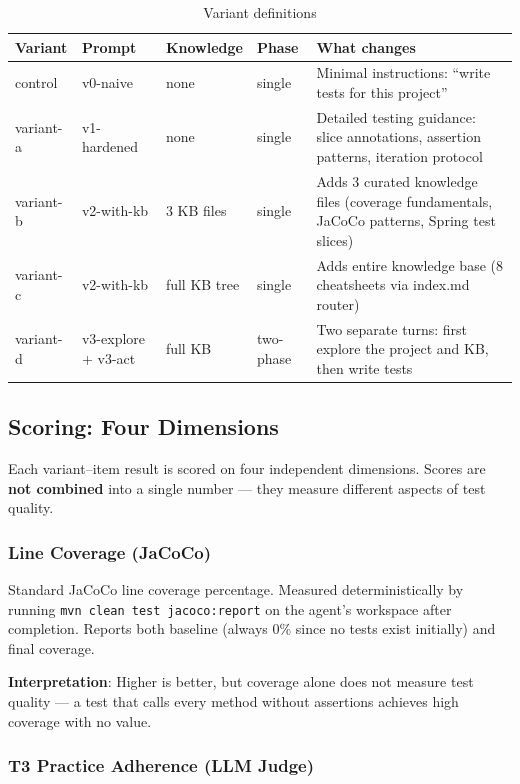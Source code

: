 \documentclass[11pt,a4paper]{article}
\begin{document}
\begin{table}[H]
\centering
\caption{Variant definitions}
\label{tab:variants}
\small
\begin{tabular}{@{}llllp{5cm}@{}}
\toprule
\textbf{Variant} & \textbf{Prompt} & \textbf{Knowledge} & \textbf{Phase} & \textbf{What changes} \\
\midrule
control   & v0-naive    & none          & single    & Minimal instructions: ``write tests for this project'' \\
variant-a & v1-hardened & none          & single    & Detailed testing guidance: slice annotations, assertion patterns, iteration protocol \\
variant-b & v2-with-kb  & 3 KB files    & single    & Adds 3 curated knowledge files (coverage fundamentals, JaCoCo patterns, Spring test slices) \\
variant-c & v2-with-kb  & full KB tree  & single    & Adds entire knowledge base (8 cheatsheets via index.md router) \\
variant-d & v3-explore + v3-act & full KB & two-phase & Two separate turns: first explore the project and KB, then write tests \\
\bottomrule
\end{tabular}
\end{table}

\subsection{Scoring: Four Dimensions}
\label{sec:scoring}

Each variant--item result is scored on four independent dimensions.
Scores are \textbf{not combined} into a single number --- they measure
different aspects of test quality.

\subsubsection{Line Coverage (JaCoCo)}

Standard JaCoCo line coverage percentage. Measured deterministically by running
\texttt{mvn clean test jacoco:report} on the agent's workspace after completion.
Reports both baseline (always 0\% since no tests exist initially) and final coverage.

\textbf{Interpretation}: Higher is better, but coverage alone does not measure
test quality --- a test that calls every method without assertions achieves high
coverage with no value.

\subsubsection{T3 Practice Adherence (LLM Judge)}
\end{document}
